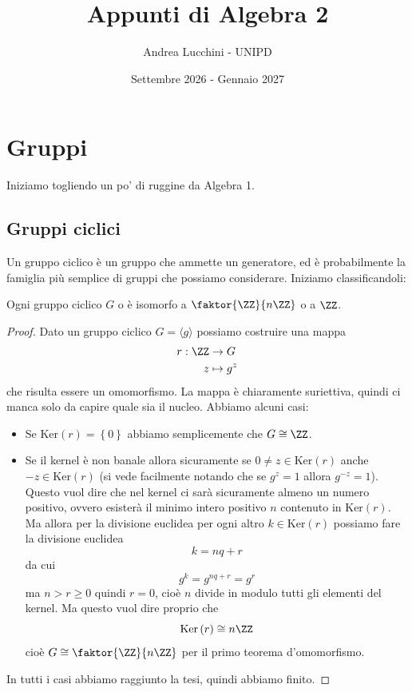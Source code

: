 \documentclass[11pt]{scrartcl}
\renewcommand{\ker}[1]{\text{Ker}\left(#1\right)}
\begin{document}
	\title{Appunti di Algebra 2}
	\subtitle{Andrea Lucchini - UNIPD}
	\date{Settembre 2026 - Gennaio 2027}
	
	
	\maketitle
	
	\tableofcontents
	
	\newpage
	
	\section{Gruppi}
	
	Iniziamo togliendo un po' di ruggine da Algebra 1.
	
	\subsection{Gruppi ciclici}
	
	Un gruppo ciclico è un gruppo che ammette un generatore, ed è probabilmente la famiglia più semplice di gruppi che possiamo considerare. Iniziamo classificandoli:
	 
	\begin{theorem}
		Ogni gruppo ciclico $G$ o è isomorfo a $\faktor{\ZZ}{n\ZZ}$ o a $\ZZ$.
	\end{theorem}
	\begin{proof}
		Dato un gruppo ciclico $G=\langle g \rangle$ possiamo costruire una mappa 
		\begin{align*}
			r:\ZZ & \to G \\
			z & \mapsto g^z
		\end{align*}
		che risulta essere un omomorfismo. La mappa è chiaramente suriettiva, quindi ci manca solo da capire quale sia il nucleo. Abbiamo alcuni casi:
		\begin{itemize}
			\item Se $\ker{r}=\left\{0\right\}$ abbiamo semplicemente che $G\cong \ZZ$.
			\item Se il kernel è non banale allora sicuramente se $0\ne z\in \ker{r}$ anche $-z\in \ker{r}$ (si vede facilmente notando che se $g^z=1$ allora $g^{-z}=1$). Questo vuol dire che nel kernel ci sarà sicuramente almeno un numero positivo, ovvero esisterà il minimo intero positivo $n$ contenuto in $\ker{r}$. \\
			Ma allora per la divisione euclidea per ogni altro $k\in\ker{r}$ possiamo fare la divisione euclidea
			$$k=nq+r$$
			da cui
			$$g^k=g^{nq+r}=g^r$$
			ma $n>r\ge 0$ quindi $r=0$, cioè $n$ divide in modulo tutti gli elementi del kernel. Ma questo vuol dire proprio che
			$$\ker{r}\cong n\ZZ$$
			cioè $G\cong \faktor{\ZZ}{n\ZZ}$ per il primo teorema d'omomorfismo.
		\end{itemize}
		In tutti i casi abbiamo raggiunto la tesi, quindi abbiamo finito.
	\end{proof}
	
\end{document}
